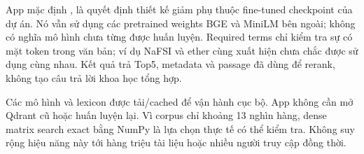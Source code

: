 App mặc định , là quyết định thiết kế giảm phụ thuộc fine-tuned checkpoint của dự án. Nó vẫn sử dụng các pretrained weights BGE và MiniLM bên ngoài; không có nghĩa mô hình chưa từng được huấn luyện. Required terms chỉ kiểm tra sự có mặt token trong văn bản; ví dụ NaFSI và ether cùng xuất hiện chưa chắc được sử dụng cùng nhau. Kết quả trả Top5, metadata và passage đã dùng để rerank, không tạo câu trả lời khoa học tổng hợp.

Các mô hình và lexicon được tải/cached để vận hành cục bộ. App không cần mở Qdrant cũ hoặc huấn luyện lại. Vì corpus chỉ khoảng 13 nghìn hàng, dense matrix search exact bằng NumPy là lựa chọn thực tế có thể kiểm tra. Không suy rộng hiệu năng này tới hàng triệu tài liệu hoặc nhiều người truy cập đồng thời.
